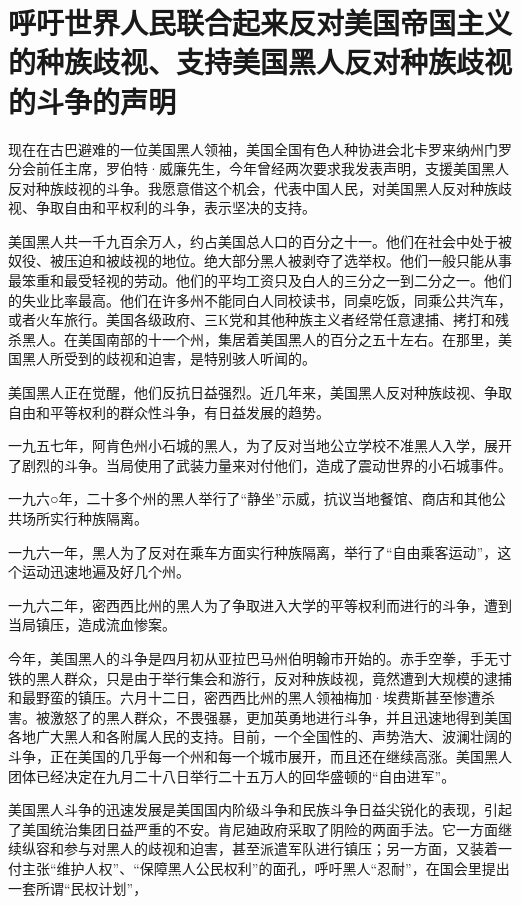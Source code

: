 \section[呼吁世界人民联合起来反对美国帝国主义的种族歧视、支持美国黑人反对种族歧视的斗争的声明（一九六三年八月八日）]{呼吁世界人民联合起来反对美国帝国主义的种族歧视、支持美国黑人反对种族歧视的斗争的声明}


现在在古巴避难的一位美国黑人领袖，美国全国有色人种协进会北卡罗来纳州门罗分会前任主席，罗伯特·威廉先生，今年曾经两次要求我发表声明，支援美国黑人反对种族歧视的斗争。我愿意借这个机会，代表中国人民，对美国黑人反对种族歧视、争取自由和平权利的斗争，表示坚决的支持。

美国黑人共一千九百余万人，约占美国总人口的百分之十一。他们在社会中处于被奴役、被压迫和被歧视的地位。绝大部分黑人被剥夺了选举权。他们一般只能从事最笨重和最受轻视的劳动。他们的平均工资只及白人的三分之一到二分之一。他们的失业比率最高。他们在许多州不能同白人同校读书，同桌吃饭，同乘公共汽车，或者火车旅行。美国各级政府、三K党和其他种族主义者经常任意逮捕、拷打和残杀黑人。在美国南部的十一个州，集居着美国黑人的百分之五十左右。在那里，美国黑人所受到的歧视和迫害，是特别骇人听闻的。

美国黑人正在觉醒，他们反抗日益强烈。近几年来，美国黑人反对种族歧视、争取自由和平等权利的群众性斗争，有日益发展的趋势。

一九五七年，阿肯色州小石城的黑人，为了反对当地公立学校不准黑人入学，展开了剧烈的斗争。当局使用了武装力量来对付他们，造成了震动世界的小石城事件。

一九六○年，二十多个州的黑人举行了“静坐”示威，抗议当地餐馆、商店和其他公共场所实行种族隔离。

一九六一年，黑人为了反对在乘车方面实行种族隔离，举行了“自由乘客运动”，这个运动迅速地遍及好几个州。

一九六二年，密西西比州的黑人为了争取进入大学的平等权利而进行的斗争，遭到当局镇压，造成流血惨案。

今年，美国黑人的斗争是四月初从亚拉巴马州伯明翰市开始的。赤手空拳，手无寸铁的黑人群众，只是由于举行集会和游行，反对种族歧视，竟然遭到大规模的逮捕和最野蛮的镇压。六月十二日，密西西比州的黑人领袖梅加·埃费斯甚至惨遭杀害。被激怒了的黑人群众，不畏强暴，更加英勇地进行斗争，并且迅速地得到美国各地广大黑人和各附属人民的支持。目前，一个全国性的、声势浩大、波澜壮阔的斗争，正在美国的几乎每一个州和每一个城市展开，而且还在继续高涨。美国黑人团体已经决定在九月二十八日举行二十五万人的回华盛顿的“自由进军”。

美国黑人斗争的迅速发展是美国国内阶级斗争和民族斗争日益尖锐化的表现，引起了美国统治集团日益严重的不安。肯尼廸政府采取了阴险的两面手法。它一方面继续纵容和参与对黑人的歧视和迫害，甚至派遣军队进行镇压；另一方面，又装着一付主张“维护人权”、“保障黑人公民权利”的面孔，呼吁黑人“忍耐”，在国会里提出一套所谓“民权计划”，

